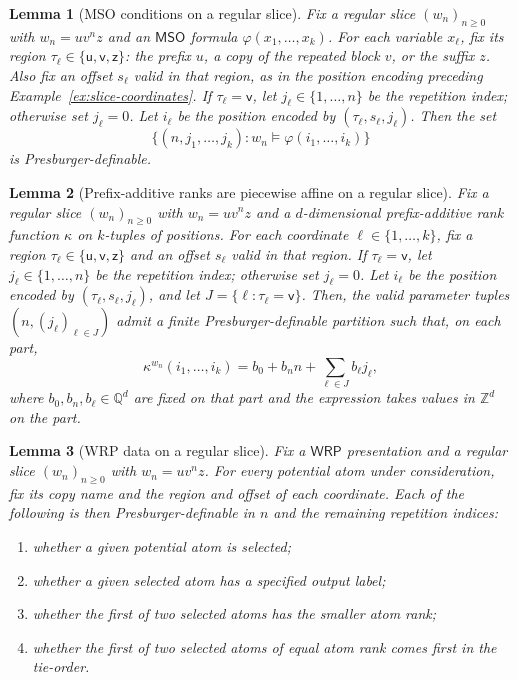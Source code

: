 \documentclass[10pt,a4paper]{amsart}
\newtheorem{lemma}{Lemma}
\newcommand{\MSO}{\mathsf{MSO}}
\newcommand{\WRP}{\mathsf{WRP}}
\newcommand{\Z}{\mathbb Z}
\begin{document}
\begin{lemma}[MSO conditions on a regular slice]
\label{lem:one-loop-finite-state}
Fix a regular slice $(w_n)_{n\ge0}$ with $w_n=uv^nz$ and an $\MSO$ formula
$\varphi(x_1,\ldots,x_k)$.  For each variable $x_\ell$, fix its region
$\tau_\ell\in\{\mathsf u,\mathsf v,\mathsf z\}$: the prefix $u$, a copy of the
repeated block $v$, or the suffix $z$.  Also fix an offset $s_\ell$ valid in
that region, as in the position encoding preceding
Example~\ref{ex:slice-coordinates}.  If $\tau_\ell=\mathsf v$, let
$j_\ell\in\{1,\ldots,n\}$ be the repetition index; otherwise set $j_\ell=0$.
Let $i_\ell$ be the position encoded by $(\tau_\ell,s_\ell,j_\ell)$.  Then the
set
\[
   \{(n,j_1,\ldots,j_k):
      w_n\models\varphi(i_1,\ldots,i_k)\}
\]
is Presburger-definable.
\end{lemma}

\begin{lemma}[Prefix-additive ranks are piecewise affine on a regular slice]
\label{lem:one-loop-rank-affine}
Fix a regular slice $(w_n)_{n\ge0}$ with $w_n=uv^nz$ and a $d$-dimensional prefix-additive rank
function $\kappa$ on $k$-tuples of positions.  For each coordinate
$\ell\in\{1,\ldots,k\}$, fix a region
$\tau_\ell\in\{\mathsf u,\mathsf v,\mathsf z\}$ and an offset $s_\ell$ valid in
that region.  If $\tau_\ell=\mathsf v$, let
$j_\ell\in\{1,\ldots,n\}$ be the repetition index; otherwise set $j_\ell=0$.
Let $i_\ell$ be the position encoded by $(\tau_\ell,s_\ell,j_\ell)$, and let
$J=\{\ell:\tau_\ell=\mathsf v\}$.  Then, the valid parameter tuples
$(n,(j_\ell)_{\ell\in J})$ admit a finite Presburger-definable partition such
that, on each part,
\[
   \kappa^{w_n}(i_1,\ldots,i_k)
   =b_0+b_n n+\sum_{\ell\in J} b_\ell j_\ell,
\]
where $b_0,b_n,b_\ell\in\mathbb Q^d$ are fixed on that part and the expression
takes values in $\Z^d$ on the part.
\end{lemma}

\begin{lemma}[WRP data on a regular slice]
\label{lem:one-loop-presburger}
Fix a $\WRP$ presentation and a regular slice $(w_n)_{n\ge0}$ with
$w_n=uv^nz$.  For every potential
atom under consideration, fix its copy name and the region and offset of each
coordinate.  Each of the following is then Presburger-definable in $n$ and the
remaining repetition indices:
\begin{enumerate}[label=(\alph*)]
\item whether a given potential atom is selected;
\item whether a given selected atom has a specified output label;
\item whether the first of two selected atoms has the smaller atom rank;
\item whether the first of two selected atoms of equal atom rank comes first in
the tie-order.
\end{enumerate}
\end{lemma}
\end{document}
